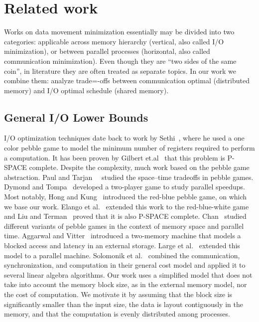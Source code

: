 \documentclass[sigplan,review,anonymous,10pt]{acmart}\settopmatter{printfolios=true,printccs=false,printacmref=false}
\begin{document}
\section{Related work}

Works on data movement minimization essentially may be divided into two 
categories: applicable across 
memory hierarchy (vertical, also called I/O minimization), or between parallel 
processes (horizontal, also called communication minimization). Even though 
they are ``two sides of the same coin'', in literature they are often treated 
as 
separate topics. In our work we combine them: analyze
trade=-offs between 
communication optimal (distributed memory) and I/O optimal schedule 
(shared memory).

\subsection{General I/O Lower Bounds}
I/O optimization techniques date back to work by 
Sethi~\cite{completeRegisterProblems}, where he used a one color pebble game to 
model the minimum number of registers required to perform a computation. It has 
been proven by Gilbert et.al~\cite{pebblegameregister} that this problem is 
P-SPACE complete. Despite the complexity, much work based on the pebble game 
abstraction. Paul and Tarjan~~\cite{pebbleTradeoffs} studied the space--time 
tradeoffs in pebble games. Dymond and Tompa~\cite{dymond2playerpebblegame} 
developed a 
two-player game to study parallel speedups. Most notably, Hong and 
Kung~\cite{redblue} introduced the red-blue pebble game, on which we base our 
work. Elango et al.~\cite{redbluewhite} extended this work to the 
red-blue-white 
game and Liu and Terman~\cite{redblueHard} proved that it is also P-SPACE 
complete. Chan~\cite{justApebbleGame} studied different variants of pebble 
games in the context of memory space and parallel time. Aggarwal and 
Vitter~\cite{externalMem}
introduced a two-memory machine that models a blocked access and latency in an
external storage. Large et al.~\cite{parallelExMem} extended this model to a 
parallel machine. Solomonik et al.~\cite{edgarTradeoff} combined the 
communication, synchronization, and computation in their general cost model and 
applied 
it to several linear algebra algorithms. Our work uses a simplified model 
that does not take into account the memory block size, as in the external 
memory model, nor the cost of computation. We motivate it by assuming that the 
block size is significantly smaller than the input size, the data is layout 
contiguously in the memory, and that the computation is evenly distributed 
among processes.
\end{document}
